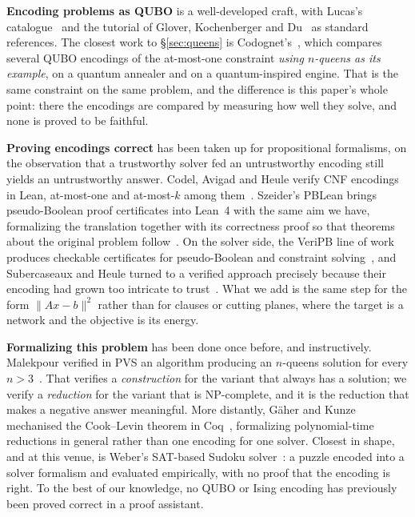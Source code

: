 \documentclass{easychair}
\newcommand{\secref}[1]{\hyperref[#1]{\textcolor{academicpurple}{\S\ref*{#1}}}}
\newcommand{\citeref}[1]{\textcolor{academicpurple}{\cite{#1}}}
\begin{document}
\medskip\noindent\textbf{Encoding problems as QUBO} is a well-developed craft, with Lucas's
catalogue~\citeref{lucas2014ising} and the tutorial of Glover, Kochenberger and
Du~\citeref{glover2019} as standard references. The closest work to \secref{sec:queens} is
Codognet's~\citeref{codognet2023}, which compares several QUBO encodings of the at-most-one constraint
\emph{using $n$-queens as its example}, on a quantum annealer and on a quantum-inspired engine. That
is the same constraint on the same problem, and the difference is this paper's whole point: there the
encodings are compared by measuring how well they solve, and none is proved to be faithful.

\medskip\noindent\textbf{Proving encodings correct} has been taken up for propositional formalisms, on
the observation that a trustworthy solver fed an untrustworthy encoding still yields an untrustworthy
answer. Codel, Avigad and Heule verify CNF encodings in Lean, at-most-one and at-most-$k$ among
them~\citeref{codel2023}. Szeider's PBLean brings pseudo-Boolean proof certificates into Lean~4 with
the same aim we have, formalizing the translation together with its correctness proof so that theorems
about the original problem follow~\citeref{szeider2026}. On the solver side, the VeriPB line of work
produces checkable certificates for pseudo-Boolean and constraint solving~\citeref{bogaerts2022}, and
Subercaseaux and Heule turned to a verified approach precisely because their encoding had grown too
intricate to trust~\citeref{subercaseaux2023}. What we add is the same step for the form
$\lVert Ax-b\rVert^2$ rather than for clauses or cutting planes, where the target is a network and the
objective is its energy.

\medskip\noindent\textbf{Formalizing this problem} has been done once before, and instructively.
Malekpour verified in PVS an algorithm producing an $n$-queens solution for every
$n > 3$~\citeref{malekpour2020}. That verifies a \emph{construction} for the variant that always has a
solution; we verify a \emph{reduction} for the variant that is \textsf{NP}-complete, and it is the
reduction that makes a negative answer meaningful. More distantly, G\"{a}her and Kunze mechanised the
Cook--Levin theorem in Coq~\citeref{gaeher2021}, formalizing polynomial-time reductions in general
rather than one encoding for one solver. Closest in shape, and at this venue, is Weber's SAT-based
Sudoku solver~\citeref{weber2006}: a puzzle encoded into a solver formalism and evaluated
empirically, with no proof that the encoding is right. To the best of our knowledge, no QUBO or Ising
encoding has previously been proved correct in a proof assistant.
\end{document}
